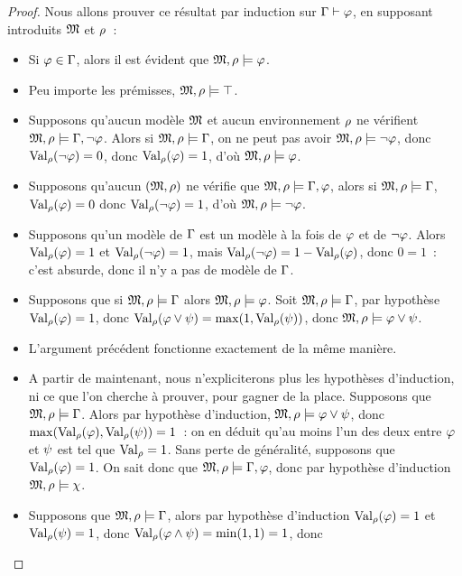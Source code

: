 \begin{proof}
  Nous allons prouver ce résultat par induction sur $\Gamma\vdash \varphi$, en
  supposant introduits $\mathfrak{M}$ et $\rho$~:
  \begin{itemize}
  \item[$\Rax$~:] Si $\varphi\in \Gamma$, alors il est évident que
    $\mathfrak{M},\rho\models \varphi$.
  \item[$\RtopI$~:] Peu importe les prémisses, $\mathfrak{M},\rho\models \top$.
  \item[$\RbotC$~:] Supposons qu'aucun modèle $\mathfrak{M}$ et aucun
    environnement $\rho$ ne vérifient
    $\mathfrak{M},\rho\models \Gamma,\lnot \varphi$. Alors si
    $\mathfrak{M},\rho\models \Gamma$, on ne peut pas avoir
    $\mathfrak{M},\rho\models \lnot \varphi$, donc $\operatorname{Val}_{\rho}(\lnot \varphi) = 0$, donc
    $\operatorname{Val}_{\rho}(\varphi) = 1$, d'où $\mathfrak{M},\rho\models \varphi$.
  \item[$\RnotI$~:] Supposons qu'aucun $(\mathfrak{M},\rho)$ ne vérifie que
    $\mathfrak{M},\rho\models \Gamma,\varphi$, alors si
    $\mathfrak{M},\rho\models \Gamma$, $\operatorname{Val}_{\rho}(\varphi) = 0$ donc
    $\operatorname{Val}_{\rho}(\lnot \varphi) = 1$, d'où $\mathfrak{M},\rho\models \lnot \varphi$.
  \item[$\RnotE$~:] Supposons qu'un modèle de $\Gamma$ est un modèle à la
    fois de $\varphi$ et de $\lnot \varphi$. Alors $\operatorname{Val}_{\rho}(\varphi) = 1$ et
    $\operatorname{Val}_{\rho}(\lnot \varphi) = 1$, mais $\operatorname{Val}_{\rho}(\lnot \varphi) = 1 - \operatorname{Val}_{\rho}(\varphi)$,
    donc $0 = 1$~: c'est absurde, donc il n'y a pas de modèle de $\Gamma$.
  \item[$\RorIG$~:] Supposons que si $\mathfrak{M},\rho\models \Gamma$ alors $\mathfrak{M},\rho\models \varphi$. Soit
    $\mathfrak{M},\rho\models \Gamma$, par hypothèse $\operatorname{Val}_{\rho}(\varphi) = 1$, donc
    $\operatorname{Val}_{\rho}(\varphi\lor \psi) = \max(1,\operatorname{Val}_{\rho}(\psi))$, donc
    $\mathfrak{M},\rho\models \varphi\lor \psi$.
  \item[$\RorID$~:] L'argument précédent fonctionne exactement de
    la même manière.
  \item[$\RorE$~:] A partir de maintenant, nous n'expliciterons plus les
    hypothèses d'induction, ni ce que l'on cherche à prouver, pour gagner de la
    place. Supposons que $\mathfrak{M},\rho\models \Gamma$. Alors par hypothèse
    d'induction, $\mathfrak{M},\rho\models \varphi\lor \psi$, donc
    $\max(\operatorname{Val}_{\rho}(\varphi),\operatorname{Val}_{\rho}(\psi)) = 1$~: on en déduit qu'au moins l'un des
    deux entre $\varphi$ et $\psi$ est tel que $\operatorname{Val}_{\rho} = 1$. Sans perte de
    généralité, supposons que $\operatorname{Val}_{\rho}(\varphi) = 1$. On sait donc que
    $\mathfrak{M},\rho\models \Gamma,\varphi$, donc par hypothèse d'induction
    $\mathfrak{M},\rho\models\chi$.
  \item[$\RandI$~:] Supposons que $\mathfrak{M},\rho\models\Gamma$,
    alors par hypothèse d'induction $\operatorname{Val}_{\rho}(\varphi) = 1$ et $\operatorname{Val}_{\rho}(\psi) = 1$,
    donc $\operatorname{Val}_{\rho}(\varphi\land \psi) = \min(1,1) = 1$, donc

\end{itemize}
\end{proof}
